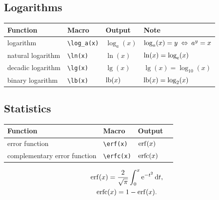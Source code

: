 \documentclass[DIV=13]{scrartcl}
\begin{document}

\subsection{Logarithms}
\begin{center}
  \begin{tabular}{llll}
    \toprule
    \textbf{Function} & \textbf{Macro}   & \textbf{Output}
                      & \textbf{Note}                       \\
    \midrule
    logarithm         & \verb|\log_a(x)| & $\log_a(x)$
                      & $\log_a(x)=y \;\mathbin{\Leftrightarrow}\; a^y=x$     \\
    natural logarithm & \verb|\ln(x)|    & $\ln(x)$
                      & $\ln(x) = \log_{\mathrm{e}}(x)$               \\
    decadic logarithm & \verb|\lg(x)|    & $\lg(x)$
                      & $\lg(x) = \log_{10}(x)$             \\
    binary logarithm  & \verb|\lb(x)|    & $\operatorname{lb}(x)$
                      & $\operatorname{lb}(x) = \log_2(x)$                \\
    \bottomrule
  \end{tabular}
\end{center}


\subsection{Statistics}
\begin{center}
  \begin{tabular}{llll}
    \toprule
    \textbf{Function}            & \textbf{Macro}  & \textbf{Output} \\
    \midrule
    error function               & \verb|\erf(x)|  & $\operatorname{erf}(x)$       \\
    complementary error function & \verb|\erfc(x)| & $\operatorname{erfc}(x)$      \\
    \bottomrule
  \end{tabular}
\end{center}
\begin{gather}
  \operatorname{erf}(x) = \frac{2}{\sqrt{\pi}}\int_0^x \mathrm{e}^{-t^2}\mathop{}\!\mathrm{d} t, \\
  \operatorname{erfc}(x) = 1 - \operatorname{erf}(x).
\end{gather}
\end{document}
